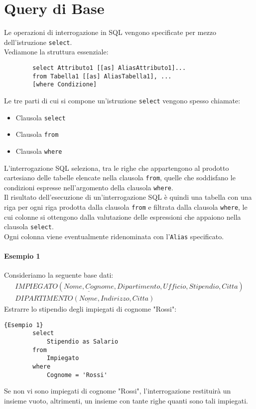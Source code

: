 \chapter{Query di Base}

Le operazioni di interrogazione in SQL vengono specificate per mezzo dell'istruzione \texttt{select}.\\
Vediamone la struttura essenziale:
    \begin{lstlisting}
        select Attributo1 [[as] AliasAttributo1]...
        from Tabella1 [[as] AliasTabella1], ...
        [where Condizione]
    \end{lstlisting}
Le tre parti di cui si compone un'istruzione \texttt{select} vengono spesso chiamate:
    \begin{itemize}
        \item{Clausola \texttt{select}}
        \item{Clausola \texttt{from}}
        \item{Clausola \texttt{where}}
    \end{itemize}
L'interrogazione SQL seleziona, tra le righe che appartengono al prodotto cartesiano delle tabelle elencate nella clausola \texttt{from}, quelle che soddisfano le condizioni espresse nell'argomento della clausola \texttt{where}.\\
Il risultato dell'esecuzione di un'interrogazione SQL è quindi una tabella con una riga per ogni riga prodotta dalla clausola \texttt{from} e filtrata dalla clausola \texttt{where}, le cui colonne si ottengono dalla valutazione delle espressioni che appaiono nella clausola \texttt{select}.\\
Ogni colonna viene eventualmente ridenominata con l'\texttt{Alias} specificato.

\subsubsection{Esempio 1}
Consideriamo la seguente base dati:
    \begin{equation}\begin{aligned}
        IMPIEGATO (\underline{Nome, Cognome}, Dipartimento, Ufficio, Stipendio, Citta)\\
        DIPARTIMENTO (\underline{Nome}, Indirizzo, Citta)
    \end{aligned}\end{equation}
Estrarre lo stipendio degli impiegati di cognome "Rossi":
    \begin{lstlisting}{Esempio 1}
        select 
            Stipendio as Salario
        from 
            Impiegato
        where 
            Cognome = 'Rossi'
    \end{lstlisting}
Se non vi sono impiegati di cognome "Rossi", l'interrogazione restituirà un insieme vuoto, altrimenti, un insieme con tante righe quanti sono tali impiegati. 



